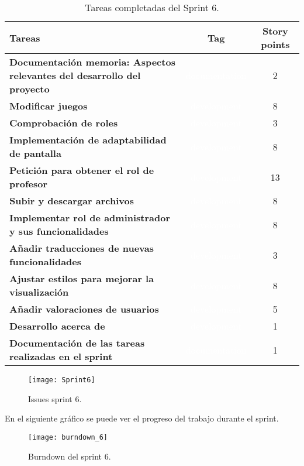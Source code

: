 \begin{table}[ht!]
    \centering
    \resizebox{15cm}{!} {
    \begin{tabular}{|l|c|c|}
    \hline
    \rowcolor[rgb]{0.99,0.93,0.93}
    \textbf{Tareas}     &\textbf{Tag}     & \textbf{Story points} \\ \hline
    \textbf{Documentación memoria: Aspectos relevantes del desarrollo del proyecto}          &\cellcolor[rgb]{0.0,0.33,0.71}\textcolor{white}{documentation}      &2 \\ \hline 
    \textbf{Modificar juegos}         &\cellcolor[rgb]{0.99,0.83,0.93}\textcolor{white}{development}      &8 \\ \hline
     \textbf{Comprobación de roles}         &\cellcolor[rgb]{0.99,0.83,0.93}\textcolor{white}{development}      &3 \\ \hline 
    \textbf{Implementación de adaptabilidad de pantalla}         &\cellcolor[rgb]{0.99,0.83,0.93}\textcolor{white}{development}      &8 \\ \hline 
    \textbf{Petición para obtener el rol de profesor}         &\cellcolor[rgb]{0.99,0.83,0.93}\textcolor{white}{development}      &13 \\ \hline 
    \textbf{Subir y descargar archivos}         &\cellcolor[rgb]{0.99,0.83,0.93}\textcolor{white}{development}      &8 \\ \hline 
    \textbf{Implementar rol de administrador y sus funcionalidades}         &\cellcolor[rgb]{0.99,0.83,0.93}\textcolor{white}{development}      &8 \\ \hline 
    \textbf{Añadir traducciones de nuevas funcionalidades}         &\cellcolor[rgb]{0.99,0.83,0.93}\textcolor{white}{development}      &3 \\ \hline 
    \textbf{Ajustar estilos para mejorar la visualización}         &\cellcolor[rgb]{0.99,0.83,0.93}\textcolor{white}{development}      &8 \\ \hline 
    \textbf{Añadir valoraciones de usuarios}         &\cellcolor[rgb]{0.99,0.83,0.93}\textcolor{white}{development}      &5 \\ \hline 
    \textbf{Desarrollo acerca de}         &\cellcolor[rgb]{0.99,0.83,0.93}\textcolor{white}{development}      &1 \\ \hline 
    \textbf{Documentación de las tareas realizadas en el sprint}         &\cellcolor[rgb]{0.0,0.33,0.71}\textcolor{white}{documentation}      &1 \\ \hline 
    \end{tabular}}
    \caption{Tareas completadas del Sprint 6.}
    \label{tab:my_label}
\end{table}
\newpage
\begin{figure}[htb]
    \centering
    \texttt{[image: Sprint6]}
    \caption{Issues sprint 6.}
    \label{fig:Sprint6}
\end{figure}
\newpage
En el siguiente gráfico se puede ver el progreso del trabajo durante el sprint.
\begin{figure}[htb]
    \centering
    \texttt{[image: burndown\_6]}
    \caption{Burndown del sprint 6.}
    \label{fig:burndown_6}
\end{figure}

